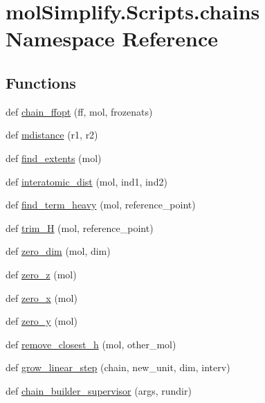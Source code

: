 \hypertarget{namespacemolSimplify_1_1Scripts_1_1chains}{}\section{mol\+Simplify.\+Scripts.\+chains Namespace Reference}
\label{namespacemolSimplify_1_1Scripts_1_1chains}
\subsection*{Functions}
\begin{DoxyCompactItemize}
\item 
def \hyperlink{namespacemolSimplify_1_1Scripts_1_1chains_ab78bad7e28885158892b1be00b583373}{chain\+\_\+ffopt} (ff, mol, frozenats)
\item 
def \hyperlink{namespacemolSimplify_1_1Scripts_1_1chains_ab1ceaf1e004166d8f0dbd4ae2209e108}{mdistance} (r1, r2)
\item 
def \hyperlink{namespacemolSimplify_1_1Scripts_1_1chains_a8a149ce0ce2729024f8d8707beb53ec3}{find\+\_\+extents} (mol)
\item 
def \hyperlink{namespacemolSimplify_1_1Scripts_1_1chains_a4ac700cf92b3713fd3a87471743d704a}{interatomic\+\_\+dist} (mol, ind1, ind2)
\item 
def \hyperlink{namespacemolSimplify_1_1Scripts_1_1chains_acf0a4747439fc42723d541a1b86fb33e}{find\+\_\+term\+\_\+heavy} (mol, reference\+\_\+point)
\item 
def \hyperlink{namespacemolSimplify_1_1Scripts_1_1chains_a2df49fdb9894eb7886528a6640906c79}{trim\+\_\+H} (mol, reference\+\_\+point)
\item 
def \hyperlink{namespacemolSimplify_1_1Scripts_1_1chains_a7a289a4dcbe191d050687098bc739571}{zero\+\_\+dim} (mol, dim)
\item 
def \hyperlink{namespacemolSimplify_1_1Scripts_1_1chains_ab3ab2e69d68fca314e9e47fad3621594}{zero\+\_\+z} (mol)
\item 
def \hyperlink{namespacemolSimplify_1_1Scripts_1_1chains_a889453bc821c2b31474ed0fc83a0a0ec}{zero\+\_\+x} (mol)
\item 
def \hyperlink{namespacemolSimplify_1_1Scripts_1_1chains_a1a54ce850b89da21a2f0be8e25b6d866}{zero\+\_\+y} (mol)
\item 
def \hyperlink{namespacemolSimplify_1_1Scripts_1_1chains_a6dffb83eddab905367e4072f1736773f}{remove\+\_\+closest\+\_\+h} (mol, other\+\_\+mol)
\item 
def \hyperlink{namespacemolSimplify_1_1Scripts_1_1chains_ac72882340914c9f087c01bfc4d50f807}{grow\+\_\+linear\+\_\+step} (chain, new\+\_\+unit, dim, interv)
\item 
def \hyperlink{namespacemolSimplify_1_1Scripts_1_1chains_ac828048f8bf0445dd12f4fc24494a019}{chain\+\_\+builder\+\_\+supervisor} (args, rundir)
\end{DoxyCompactItemize}



